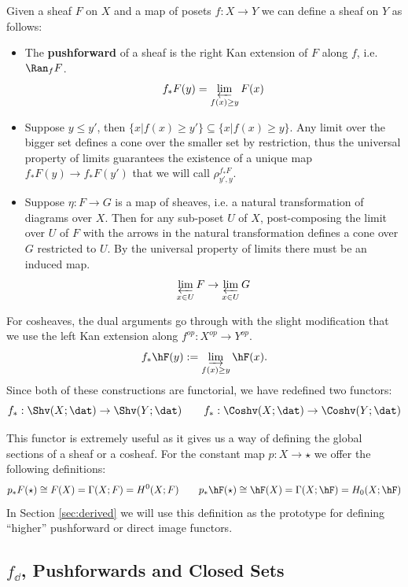 \begin{defn}

	 Given a sheaf $F$ on $X$ and a map of posets $f:X\to Y$ we can define a sheaf on $Y$ as follows:
	\begin{itemize}
	 \item The \textbf{pushforward} of a sheaf is the right Kan extension of $F$ along $f$, i.e. $\Ran_f F$. \[f_*F(y)=\varprojlim_{f(x)\geq y} F(x)\]
	 \item Suppose $y\leq y'$, then $\{x|f(x)\geq y'\}\subseteq \{x|f(x)\geq y\}$. Any limit over the bigger set defines a cone over the smaller set by restriction, thus the universal property of limits guarantees the existence of a unique map $f_*F(y)\to f_*F(y')$ that we will call $\rho^{f_*F}_{y',y}$.
	 \item Suppose $\eta:F\to G$ is a map of sheaves, i.e. a natural transformation of diagrams over $X$. Then for any sub-poset $U$ of $X$, post-composing the limit over $U$ of $F$ with the arrows in the natural transformation defines a cone over $G$ restricted to $U$. By the universal property of limits there must be an induced map. $$\varprojlim_{x\in U} F \to \varprojlim_{x\in U} G$$
	\end{itemize}
	
	For cosheaves, the dual arguments go through with the slight modification that we use the left Kan extension along $f^{op}:X^{op}\to Y^{op}$.
	\[f_*\hF(y):= \varinjlim_{f(x)\geq y}\hF(x).\]
	Since both of these constructions are functorial, we have redefined two functors:
	\[
	f_*:\Shv(X;\dat) \to \Shv(Y;\dat) \qquad f_*:\Coshv(X;\dat)\to\Coshv(Y;\dat)
	\]
\end{defn}

\begin{ex}
This functor is extremely useful as it gives us a way of defining the global sections of a sheaf or a cosheaf. For the constant map $p:X\to \star$ we offer the following definitions:
\[
	p_* F(\star)\cong F(X) = \Gamma(X;F) = H^0(X;F) \qquad p_*\hF(\star) \cong \hF(X) = \Gamma(X;\hF) = H_0(X;\hF)
\]
In Section \ref{sec:derived} we will use this definition as the prototype for defining ``higher'' pushforward or direct image functors.
\end{ex}

\subsection{$f_{\dd}$, Pushforwards and Closed Sets}
\label{subsubsec:closed_push}

